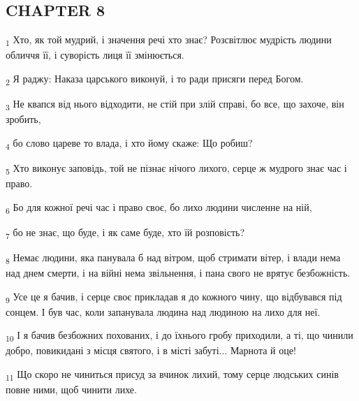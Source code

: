 \subsection{CHAPTER 8}
\begin{tcolorbox}
\textsubscript{1} Хто, як той мудрий, і значення речі хто знає? Розсвітлює мудрість людини обличчя її, і суворість лиця її змінюється.
\end{tcolorbox}
\begin{tcolorbox}
\textsubscript{2} Я раджу: Наказа царського виконуй, і то ради присяги перед Богом.
\end{tcolorbox}
\begin{tcolorbox}
\textsubscript{3} Не квапся від нього відходити, не стій при злій справі, бо все, що захоче, він зробить,
\end{tcolorbox}
\begin{tcolorbox}
\textsubscript{4} бо слово цареве то влада, і хто йому скаже: Що робиш?
\end{tcolorbox}
\begin{tcolorbox}
\textsubscript{5} Хто виконує заповідь, той не пізнає нічого лихого, серце ж мудрого знає час і право.
\end{tcolorbox}
\begin{tcolorbox}
\textsubscript{6} Бо для кожної речі час і право своє, бо лихо людини численне на ній,
\end{tcolorbox}
\begin{tcolorbox}
\textsubscript{7} бо не знає, що буде, і як саме буде, хто їй розповість?
\end{tcolorbox}
\begin{tcolorbox}
\textsubscript{8} Немає людини, яка панувала б над вітром, щоб стримати вітер, і влади нема над днем смерти, і на війні нема звільнення, і пана свого не врятує безбожність.
\end{tcolorbox}
\begin{tcolorbox}
\textsubscript{9} Усе це я бачив, і серце своє прикладав я до кожного чину, що відбувався під сонцем. І був час, коли запанувала людина над людиною на лихо для неї.
\end{tcolorbox}
\begin{tcolorbox}
\textsubscript{10} І я бачив безбожних похованих, і до їхнього гробу приходили, а ті, що чинили добро, повикидані з місця святого, і в місті забуті... Марнота й оце!
\end{tcolorbox}
\begin{tcolorbox}
\textsubscript{11} Що скоро не чиниться присуд за вчинок лихий, тому серце людських синів повне ними, щоб чинити лихе.
\end{tcolorbox}

